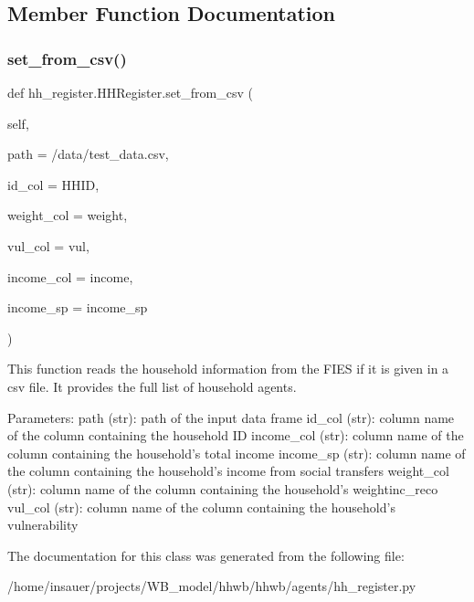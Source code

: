 \subsection{Member Function Documentation}
\mbox{\label{classhh__register_1_1HHRegister_ac4f13033280159722bcfbac281973465}} 
\subsubsection{\texorpdfstring{set\+\_\+from\+\_\+csv()}{set\_from\_csv()}}
{\footnotesize\ttfamily def hh\+\_\+register.\+H\+H\+Register.\+set\+\_\+from\+\_\+csv (\begin{DoxyParamCaption}\item[{}]{self,  }\item[{}]{path = {\ttfamily \textquotesingle{}/data/test\+\_\+data.csv\textquotesingle{}},  }\item[{}]{id\+\_\+col = {\ttfamily \textquotesingle{}HHID\textquotesingle{}},  }\item[{}]{weight\+\_\+col = {\ttfamily \textquotesingle{}weight\textquotesingle{}},  }\item[{}]{vul\+\_\+col = {\ttfamily \textquotesingle{}vul\textquotesingle{}},  }\item[{}]{income\+\_\+col = {\ttfamily \textquotesingle{}income\textquotesingle{}},  }\item[{}]{income\+\_\+sp = {\ttfamily \textquotesingle{}income\+\_\+sp\textquotesingle{}} }\end{DoxyParamCaption})}

\begin{DoxyVerb}This function reads the household information from the FIES if it is given in a
csv file. It provides the full list of household agents.

Parameters:
    path (str): path of the input data frame
    id_col (str): column name of the column containing the household ID
    income_col (str): column name of the column containing the household's total income
    income_sp (str): column name of the column containing the household's income from
              social transfers
    weight_col (str): column name of the column containing the household's weightinc_reco
    vul_col (str): column name of the column containing the household's vulnerability
\end{DoxyVerb}
 

The documentation for this class was generated from the following file\+:\begin{DoxyCompactItemize}
\item 
/home/insauer/projects/\+W\+B\+\_\+model/hhwb/hhwb/agents/hh\+\_\+register.\+py\end{DoxyCompactItemize}
